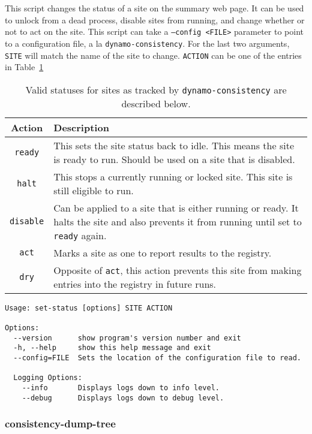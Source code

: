 This script changes the status of a site on the summary web page.
It can be used to unlock from a dead process, disable sites from running,
and change whether or not to act on the site.
This script can take a \texttt{--config <FILE>} parameter to point
to a configuration file, a la \texttt{dynamo-consistency}.
For the last two arguments, \texttt{SITE} will match
the name of the site to change.
\texttt{ACTION} can be one of the entries in Table~\ref{tab:status-actions}
%
\begin{table}
  \caption[\texttt{dynamo-consistency} site statuses]{
    Valid statuses for sites as tracked by \texttt{dynamo-consistency}
    are described below.
  }
  {\renewcommand{\arraystretch}{1.5}
  \begin{tabularx}{\textwidth}{|c|X|}
    \hline
    Action & Description \\
    \hline
    \hline
    \texttt{ready} &
    This sets the site status back to idle.
    This means the site is ready to run.
    Should be used on a site that is disabled. \\
    \hline
    \texttt{halt} &
    This stops a currently running or locked site.
    This site is still eligible to run. \\
    \hline
    \texttt{disable} &
    Can be applied to a site that is either running or ready.
    It halts the site and also prevents it from running until set to \texttt{ready} again. \\
    \hline
    \texttt{act} &
    Marks a site as one to report results to the registry. \\
    \hline
    \texttt{dry} &
    Opposite of \texttt{act},
    this action prevents this site from making entries into the registry in future runs. \\
    \hline
  \end{tabularx}}
  \label{tab:status-actions}
\end{table}
{\small
\begin{verbatim}
Usage: set-status [options] SITE ACTION

Options:
  --version      show program's version number and exit
  -h, --help     show this help message and exit
  --config=FILE  Sets the location of the configuration file to read.

  Logging Options:
    --info       Displays logs down to info level.
    --debug      Displays logs down to debug level.
\end{verbatim}
}

\subsubsection{consistency-dump-tree}

